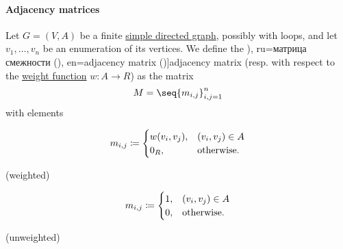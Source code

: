 \paragraph{Adjacency matrices}

\begin{definition}\label{def:graph_adjacency_matrix}\mimprovised
  Let \( G = (V, A) \) be a finite \hyperref[def:directed_graph]{simple directed graph}, possibly with loops, and let \( v_1, \ldots, v_n \) be an enumeration of its vertices. We define the  \term[bg=матрица на съседство (\cite[52]{Мирчев2001}), ru=матрица смежности (\cite[27]{Емеличев1990}), en=adjacency matrix ()]{adjacency matrix} (resp.  with respect to the \hyperref[def:weighted_set]{weight function} \( w: A \to R \)) as the matrix
  \begin{equation*}
    M = \seq{ m_{i,j} }_{i,j=1}^n
  \end{equation*}
  with elements
  \begin{TwoColumns}
    \begin{equation*}
      m_{i,j} \coloneqq \begin{cases}
        w(v_i, v_j), &(v_i, v_j) \in A \\
        0_R,         &\T{otherwise.}
      \end{cases}
    \end{equation*}
    \begin{center}
      (weighted)
    \end{center}
  \BeginSecondColumn
    \begin{equation*}
      m_{i,j} \coloneqq \begin{cases}
        1, &(v_i, v_j) \in A \\
        0, &\T{otherwise.}
      \end{cases}
    \end{equation*}
    \begin{center}
      (unweighted)
    \end{center}
  \end{TwoColumns}
\end{definition}
